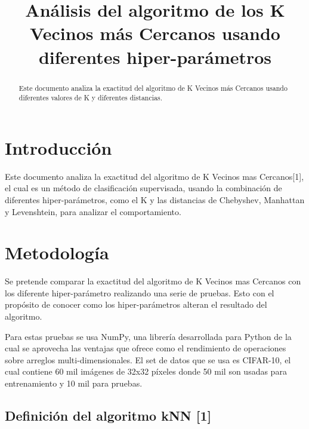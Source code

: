 \documentclass[conference]{IEEEtran}
\begin{document}
\title{Análisis del algoritmo de los K Vecinos más Cercanos usando diferentes hiper-parámetros}

\author{
}

\maketitle

\begin{abstract}
Este documento analiza la exactitud del algoritmo de K Vecinos más Cercanos usando diferentes valores de K y diferentes distancias.
\end{abstract}

\IEEEpeerreviewmaketitle



\section{Introducción}
Este documento analiza la exactitud del algoritmo de K Vecinos mas Cercanos[1], el cual es un método de clasificación supervisada, usando la combinación de diferentes hiper-parámetros, como el K y las distancias de Chebyshev, Manhattan y Levenshtein, para analizar el comportamiento.

\section{Metodología}

Se pretende comparar la exactitud del algoritmo de K Vecinos mas Cercanos con los diferente hiper-parámetro realizando una serie de pruebas. Esto con el propósito de conocer como los hiper-parámetros alteran el resultado del algoritmo.

Para estas pruebas se usa NumPy, una librería desarrollada para Python de la cual se aprovecha las ventajas que ofrece como el rendimiento de operaciones sobre arreglos multi-dimensionales. El set de datos que se usa es CIFAR-10, el cual contiene 60 mil imágenes de 32x32 píxeles donde 50 mil son usadas para entrenamiento y 10 mil para pruebas.

\subsection{Definición del algoritmo kNN [1]}
\end{document}

